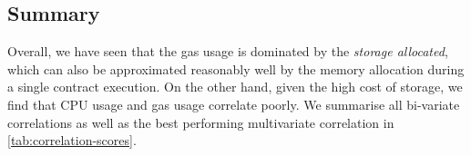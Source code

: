 \subsection{Summary}
Overall, we have seen that the gas usage is dominated by the \emph{storage allocated}, which can also be approximated reasonably well by the memory allocation during a single contract execution. On the other hand, given the high cost of storage, we find that CPU usage and gas usage correlate poorly.
We summarise all bi-variate correlations as well as the best performing multivariate correlation in \autoref{tab:correlation-scores}.
